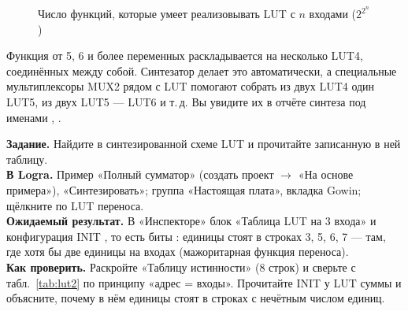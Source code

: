 \begin{figure}[H]
\centering
{}
\caption{Число функций, которые умеет реализовывать LUT с $n$ входами ($2^{2^n}$)}
\end{figure}

\begin{warnbox}
Функция от 5, 6 и более переменных раскладывается на несколько LUT4,
соединённых между собой. Синтезатор делает это автоматически, а
специальные мультиплексоры MUX2 рядом с LUT помогают собрать из двух LUT4
один LUT5, из двух LUT5 --- LUT6 и т.\,д. Вы увидите их в отчёте синтеза
под именами , .
\end{warnbox}

\begin{diybox}
\textbf{Задание.} Найдите в синтезированной схеме LUT и прочитайте записанную в ней таблицу.\\
\textbf{В Logra.} Пример «Полный сумматор» (создать проект $\to$ «На основе примера»), «Синтезировать»; группа «Настоящая плата», вкладка Gowin; щёлкните по LUT переноса.\\
\textbf{Ожидаемый результат.} В «Инспекторе» блок «Таблица LUT на 3 входа» и конфигурация INIT , то есть биты : единицы стоят в строках 3, 5, 6, 7 --- там, где хотя бы две единицы на входах (мажоритарная функция переноса).\\
\textbf{Как проверить.} Раскройте «Таблицу истинности» (8 строк) и сверьте с табл.~\ref{tab:lut2} по принципу «адрес = входы».  Прочитайте INIT у LUT суммы и объясните, почему в нём единицы стоят в строках с нечётным числом единиц.
\end{diybox}

